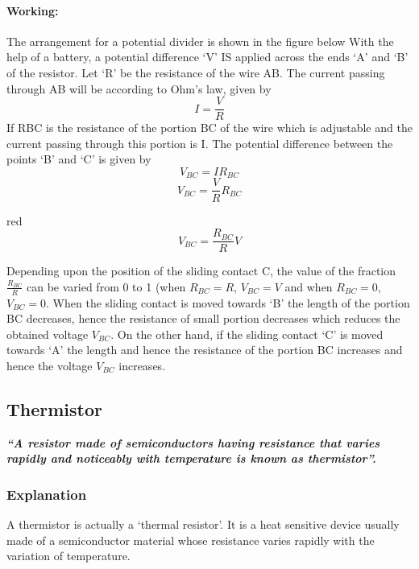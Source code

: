 \paragraph{Working:}
The arrangement for a potential divider is shown in the figure below
With the help of a battery, a potential difference ‘V’ IS applied across
the ends ‘A’ and ‘B’ of the resistor. Let ‘R’ be the resistance of the wire
AB. The current passing through AB will be according to Ohm’s law, given by
\begin{equation}\nonumber
     I=\frac{V}{R}
\end{equation}
If R{BC}  is the resistance of the portion BC of the wire which is
adjustable and the current passing through this portion is I.
The potential difference between the points ‘B’ and ‘C’ is given by
\begin{equation}\nonumber
    V_{BC}= IR_{BC}
\end{equation}
\begin{equation}\nonumber
    V_{BC}=\frac{V}{R}R_{BC}
\end{equation}
\begin{mybox}{red}{}
\begin{equation}\label{eq:12.16}
    V_{BC} = \frac{R_{BC}}{R} V
\end{equation}
\end{mybox}
Depending upon the position of the sliding contact C, the value of the
fraction $\frac{R_{BC}}{R}$ can  be varied from 0 to 1 (when $R_{BC} = R$,
$V_{BC} = V$ and when $R_{BC} = 0$, $V_{BC}=0$. When the sliding contact is moved towards ‘B’
the length of the portion BC decreases, hence the resistance of small
portion decreases which reduces the obtained voltage $V_{BC}$.
On the other hand, if the sliding contact ‘C’ is moved towards ‘A’ the
length and hence the resistance of the portion BC increases and hence
the voltage $V_{BC}$ increases.
\subsection{Thermistor}
\textit{\textbf{``A resistor made of semiconductors having resistance that varies rapidly and noticeably with temperature is known as thermistor”.}}
\subsubsection{Explanation}
A thermistor is actually a ‘thermal resistor’. It is a heat sensitive device usually made of a semiconductor material whose resistance varies rapidly with the variation of temperature.
